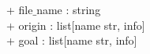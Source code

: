 {
+ file$\_$name : string \\
+ origin : list[name str, info]\\ %
+ goal : list[name str, info]\\ %
}
{
}
